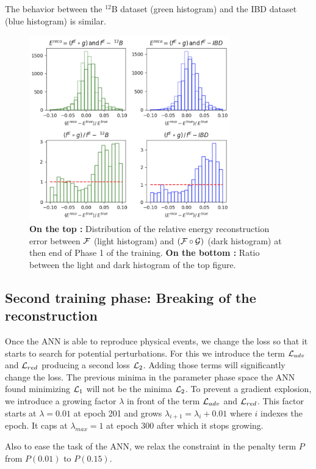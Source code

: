 \documentclass[../main.tex]{subfiles}
\begin{document}
The behavior between the $^{12}$B dataset (green histogram) and the IBD dataset (blue histogram) is similar.
\begin{figure}[ht]
  \centering
  \includegraphics[height=8cm]{images/janne/rec_err_200.png}
  \caption{\textbf{On the top :} Distribution of the relative energy reconstruction error between ${\cal F}$ (light histogram) and $({\cal F} \circ {\cal G})$ (dark histogram) at then end of Phase 1 of the training. \textbf{On the bottom :} Ratio between the light and dark histogram of the top figure.}
  \label{fig:janne:rec_err_200}
\end{figure}


\subsection{Second training phase: Breaking of the reconstruction}
\label{sec:janne:results:break}

Once the ANN is able to reproduce physical events, we change the loss so that it starts to search for potential perturbations.
For this we introduce the term ${\cal L}_{adv}$ and ${\cal L}_{red}$ producing a second loss ${\cal L}_2$.
Adding those terms will significantly change the loss.
The previous minima in the parameter phase space the ANN found minimizing ${\cal L}_1$ will not be the minima ${\cal L}_2$. To prevent a gradient explosion, we introduce a growing factor $\lambda$ in front of the term ${\cal L}_{adv}$ and ${\cal L}_{red}$. This factor starts at $\lambda  = 0.01$ at epoch 201 and grows $\lambda_{i+1} = \lambda_{i} + 0.01$ where $i$ indexes the epoch. It caps at $\lambda_{max} = 1$ at epoch 300 after which it stops growing.

Also to ease the task of the ANN, we relax the constraint in the penalty term $P$ from $P(0.01)$ to $P(0.15)$.
\end{document}
